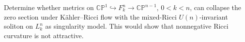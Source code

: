 \begin{example}
\label{prob:chow-ii-kahler-ricci-attractive-cone}
Determine whether metrics on
\(\mathbb{CP}^1\hookrightarrow F_k^n\to\mathbb{CP}^{n-1}\), \(0<k<n\),
can collapse the zero section under Kähler--Ricci flow with the mixed-Ricci
\(U(n)\)-invariant soliton on \(L_k^n\) as singularity model.  This would
show that nonnegative Ricci curvature is not attractive.
\end{example}

